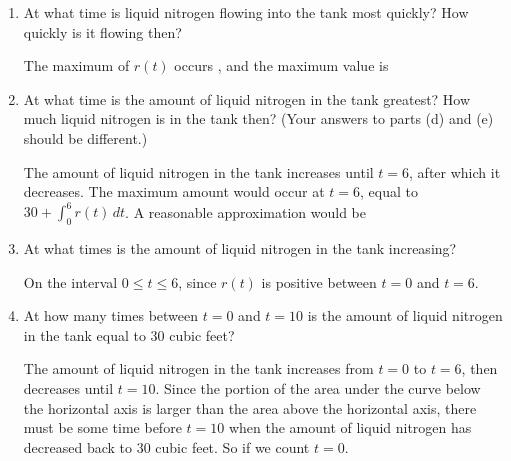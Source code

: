 \documentclass{article}
\begin{document}
\begin{enumerate}
\begin{enumerate}
\begin{enumerate}
  \item
    \begin{problem}
      At what time is liquid nitrogen flowing into the tank most quickly?
      How quickly is it flowing then?
    \end{problem}

    \begin{solution}
      The maximum of $r(t)$ occurs , and
      the maximum value is 
    \end{solution}
    \probonly{\vfill}

  \item
    \begin{problem}
      At what time is the amount of liquid nitrogen in the tank greatest?
      How much liquid nitrogen is in the tank then?
      (Your answers to parts (d) and (e) should be different.)
    \end{problem}

    \begin{solution}
      The amount of liquid nitrogen in the tank increases until $t=6$,
      after which it decreases. The maximum amount would occur at $t = 6$,
      equal to $\boxed{30+\int_0^6 r(t)\,dt}$. 
      A reasonable approximation would
      be 
    \end{solution}
    \probonly{\vfill}

  \item
    \begin{problem}
      At what times is the amount of liquid nitrogen in the tank
      increasing?
    \end{problem}

    \begin{solution}
      On the interval $\boxed{0 \leq t \leq 6}$, since $r(t)$ is positive
      between $t=0$ and $t=6$.
    \end{solution}
    \probonly{\vfill}

  \item
    \begin{problem}
      At how many times between $t = 0$ and $t = 10$ is the amount of
      liquid nitrogen in the tank equal to 30 cubic feet?
    \end{problem}

    \begin{solution}
      The amount of liquid nitrogen in the tank increases from $t=0$ to
      $t=6$, then decreases until $t=10$. Since the portion of the area 
      under the curve below the horizontal axis is larger than the area 
      above the horizontal axis, there must be some time before $t=10$ when
      the amount of liquid nitrogen has decreased back to $30$ cubic feet.
      So  if we count $t=0$.
    \end{solution}
    \probonly{\vfill}

    \end{enumerate}

\end{enumerate}
\end{enumerate}
\end{document}
